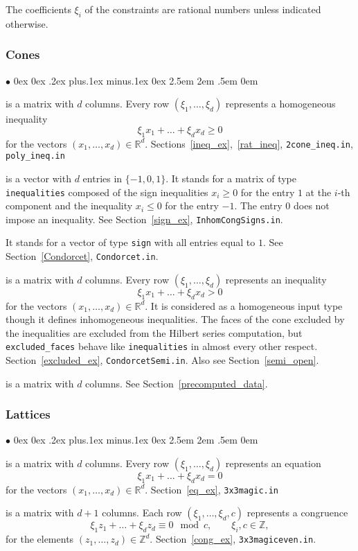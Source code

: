 \documentclass[12pt,a4paper]{scrartcl}
\newcommand{\stdli}{ \topsep0ex \partopsep0ex %
\parsep.2ex plus.1ex minus.1ex \itemsep0ex%
\leftmargin2.5em \labelwidth2em \labelsep.5em \rightmargin0em}%
\renewenvironment{itemize}{\begin{list}{{$\bullet$}}{\stdli}}{\end{list}}
\theoremstyle{definition}
\def\ZZ{{\mathbb Z}}
\def\RR{{\mathbb R}}
\def\itemtt[#1]{\item[\textbf{\ttt{#1}}]}
\def\ttt{\texttt}
\begin{document}
The coefficients $\xi_i$ of the constraints are rational numbers unless indicated otherwise.

\subsubsection{Cones}\label{HomConstrCone}

\begin{itemize}
	\itemtt[inequalities] is a matrix with $d$ columns. Every row $(\xi_1,\dots,\xi_d)$ represents a homogeneous inequality
	$$
	\xi_1x_1+\dots+\xi_dx_d\ge 0
	$$
	for the vectors $(x_1,\dots,x_d)\in\RR^d$. Sections~\ref{ineq_ex},~\ref{rat_ineq}, \verb|2cone_ineq.in|, \verb|poly_ineq.in|
	
	\itemtt[signs] is a vector with $d$ entries in $\{-1,0,1\}$.
	It stands for a matrix of type \verb|inequalities| composed of the sign inequalities $x_i\ge 0$ for the entry $1$ at the $i$-th component and the inequality $x_i\le 0$ for the entry $-1$. The entry $0$ does not impose an inequality. See Section~\ref{sign_ex}, \verb|InhomCongSigns.in|.
	
	\itemtt[nonnegative] It stands for a vector of type \verb|sign| with all entries equal to $1$. See Section~\ref{Condorcet}, \verb|Condorcet.in|.
	
	\itemtt[excluded\_faces] is a matrix with $d$ columns. Every row $(\xi_1,\dots,\xi_d)$ represents an inequality
	$$
	\xi_1x_1+\dots+\xi_dx_d> 0
	$$
	for the vectors $(x_1,\dots,x_d)\in\RR^d$. It is considered as a homogeneous input type though it defines inhomogeneous inequalities. The faces of the cone excluded by the inequalities are excluded from the Hilbert series computation, but \verb|excluded_faces| behave like \verb|inequalities| in almost every other respect.
	Section~\ref{excluded_ex}, \verb|CondorcetSemi.in|. Also see Section~\ref{semi_open}.
	
	\itemtt[support\_hyperplanes] is a matrix with $d$ columns. See Section~\ref{precomputed_data}.
\end{itemize}

\subsubsection{Lattices}

\begin{itemize}
	\itemtt[equations] is a matrix with $d$ columns. Every row $(\xi_1,\dots,\xi_d)$ represents an equation
	$$
	\xi_1x_1+\dots+\xi_dx_d= 0
	$$
	for the vectors $(x_1,\dots,x_d)\in\RR^d$. Section~\ref{eq_ex}, \verb|3x3magic.in|
	
	\itemtt[congruences] is a matrix with $d+1$ columns. Each row $(\xi_1,\dots,\xi_d,c)$ represents a congruence
	$$
	\xi_1z_1+\dots+\xi_dz_d\equiv 0 \mod c, \qquad \xi_i,c\in\ZZ,
	$$
	for the elements $(z_1,\dots,z_d)\in\ZZ^d$. Section~\ref{cong_ex}, \verb|3x3magiceven.in|.
\end{itemize}
\end{document}
